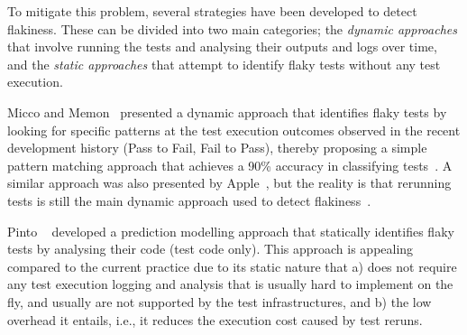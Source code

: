 To mitigate this problem, several strategies have been developed to detect flakiness. These can be divided into two main categories; the \textit{dynamic approaches} that involve running the tests and analysing their outputs and logs over time, and the \textit{static approaches} that attempt to identify flaky tests without any test execution. 

Micco and Memon~\cite{GTAC2016} presented a dynamic approach that identifies flaky tests by looking for specific patterns at the test execution outcomes observed in the recent development history (Pass to Fail, Fail to Pass), thereby proposing a simple pattern matching approach that achieves a 90\% accuracy in classifying tests~\cite{GTAC2016}. A similar approach was also presented by Apple~\cite{Kowalczyk2020}, but the reality is that rerunning tests is still the main dynamic approach used to detect flakiness~\cite{FlakinessGoogle}.



Pinto \etal~\cite{Pinto2020} developed a prediction modelling approach that statically identifies flaky tests by analysing their code (test code only). This approach is appealing compared to the current practice due to its static nature that a) does not require any test execution logging and analysis that is usually hard to implement on the fly, and usually are not supported by the test infrastructures, and b) the low overhead it entails, i.e., it reduces the execution cost caused by test reruns. 


